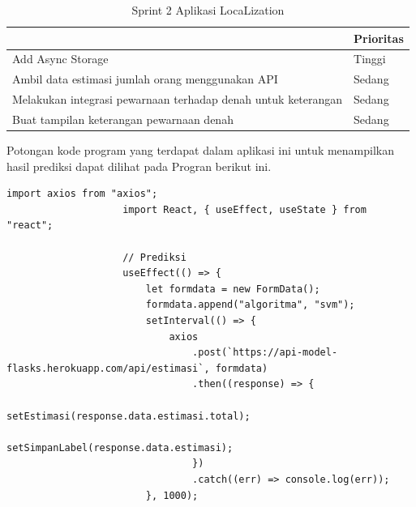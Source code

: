 \begin{enumerate}[1.]
	      \begin{table}[H]
		      \centering
		      \caption{Sprint 2 Aplikasi LocaLization}
		      \label{LocaLization-sprint-2}
		      \begin{tabular}{|l|l|}
			      \hline
			      \rowcolor[HTML]{CBCEFB}
			      \multicolumn{1}{|c|}{\cellcolor[HTML]{CBCEFB}Item}            & \multicolumn{1}{c|}{\cellcolor[HTML]{CBCEFB}Prioritas} \\ \hline
			      Add Async Storage                                             & Tinggi                                                 \\ \hline
			      Ambil data estimasi jumlah orang menggunakan API              & Sedang                                                 \\ \hline
			      Melakukan integrasi pewarnaan terhadap denah untuk keterangan & Sedang                                                 \\ \hline
			      Buat tampilan keterangan pewarnaan denah                      & Sedang                                                 \\ \hline
		      \end{tabular}
	      \end{table}

	      Potongan kode program yang terdapat dalam aplikasi ini untuk menampilkan hasil prediksi dapat dilihat pada Progran berikut ini.

	      \vspace{0.4cm}
	      \begin{lstlisting}[label=programKNNDosen]
					import axios from "axios";
					import React, { useEffect, useState } from "react";
					
					// Prediksi
					useEffect(() => {
						let formdata = new FormData();
						formdata.append("algoritma", "svm");
						setInterval(() => {
							axios
								.post(`https://api-model-flasks.herokuapp.com/api/estimasi`, formdata)
								.then((response) => {
									setEstimasi(response.data.estimasi.total);
									setSimpanLabel(response.data.estimasi);
								})
								.catch((err) => console.log(err));
						}, 1000);
				

\end{lstlisting}
\end{enumerate}
